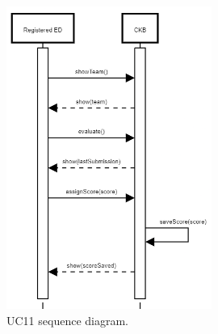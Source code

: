 \begin{center}
  \begin{figure} [H]
    \begin{center}
        \includegraphics[width=0.60\textwidth,height=\textheight,keepaspectratio]{Images/SequenceDiagrams/UC11.png}
        \caption{UC11 sequence diagram.}
        \label{fig: UC11_sequence_diagram}
    \end{center}
  \end{figure}
\end{center}

